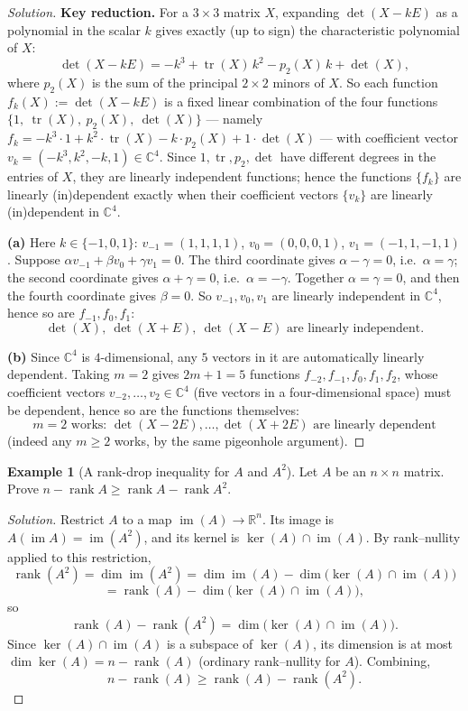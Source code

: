 \documentclass[11pt]{article}
\theoremstyle{definition}
\newtheorem{example}{Example}[section]
\newcommand{\R}{\mathbb{R}}
\newcommand{\C}{\mathbb{C}}
\newcommand{\rank}{\operatorname{rank}}
\newcommand{\trace}{\operatorname{tr}}
\begin{document}
\begin{proof}[Solution]
\textbf{Key reduction.} For a $3\times3$ matrix $X$, expanding $\det(X-kE)$ as a polynomial in the scalar $k$ gives exactly (up to sign) the characteristic polynomial of $X$:
\[
\det(X-kE) = -k^3+\trace(X)\,k^2-p_2(X)\,k+\det(X),
\]
where $p_2(X)$ is the sum of the principal $2\times2$ minors of $X$. So each function $f_k(X):=\det(X-kE)$ is a fixed linear combination of the four functions $\{1,\ \trace(X),\ p_2(X),\ \det(X)\}$ — namely $f_k = -k^3\cdot1+k^2\cdot\trace(X)-k\cdot p_2(X)+1\cdot\det(X)$ — with coefficient vector $v_k=(-k^3,k^2,-k,1)\in\C^4$. Since $1,\trace,p_2,\det$ have different degrees in the entries of $X$, they are linearly independent functions; hence the functions $\{f_k\}$ are linearly (in)dependent exactly when their coefficient vectors $\{v_k\}$ are linearly (in)dependent in $\C^4$.

\textbf{(a)} Here $k\in\{-1,0,1\}$: $v_{-1}=(1,1,1,1)$, $v_0=(0,0,0,1)$, $v_1=(-1,1,-1,1)$. Suppose $\alpha v_{-1}+\beta v_0+\gamma v_1=0$. The third coordinate gives $\alpha-\gamma=0$, i.e.\ $\alpha=\gamma$; the second coordinate gives $\alpha+\gamma=0$, i.e.\ $\alpha=-\gamma$. Together $\alpha=\gamma=0$, and then the fourth coordinate gives $\beta=0$. So $v_{-1},v_0,v_1$ are linearly independent in $\C^4$, hence so are $f_{-1},f_0,f_1$:
\[
\boxed{\det(X),\ \det(X+E),\ \det(X-E) \text{ are linearly independent}}.
\]

\textbf{(b)} Since $\C^4$ is $4$-dimensional, any $5$ vectors in it are automatically linearly dependent. Taking $m=2$ gives $2m+1=5$ functions $f_{-2},f_{-1},f_0,f_1,f_2$, whose coefficient vectors $v_{-2},\dots,v_2\in\C^4$ (five vectors in a four-dimensional space) must be dependent, hence so are the functions themselves:
\[
\boxed{m=2 \text{ works: } \det(X-2E),\dots,\det(X+2E) \text{ are linearly dependent}}
\]
(indeed any $m\ge2$ works, by the same pigeonhole argument).
\end{proof}

\begin{example}[A rank-drop inequality for $A$ and $A^2$]
Let $A$ be an $n\times n$ matrix. Prove $n-\rank A \ge \rank A - \rank A^2$.
\end{example}

\begin{proof}[Solution]
Restrict $A$ to a map $\operatorname{im}(A)\to\R^n$. Its image is $A(\operatorname{im}A)=\operatorname{im}(A^2)$, and its kernel is $\ker(A)\cap\operatorname{im}(A)$. By rank–nullity applied to this restriction,
\[
\rank(A^2)=\dim\operatorname{im}(A^2) = \dim\operatorname{im}(A) - \dim\big(\ker(A)\cap\operatorname{im}(A)\big)
\]
\[
= \rank(A) - \dim\big(\ker(A)\cap\operatorname{im}(A)\big),
\]
so
\[
\rank(A)-\rank(A^2) = \dim\big(\ker(A)\cap\operatorname{im}(A)\big).
\]
Since $\ker(A)\cap\operatorname{im}(A)$ is a subspace of $\ker(A)$, its dimension is at most $\dim\ker(A) = n-\rank(A)$ (ordinary rank–nullity for $A$). Combining,
\[
\boxed{n-\rank(A) \ge \rank(A)-\rank(A^2)}.
\]
\end{proof}
\end{document}
